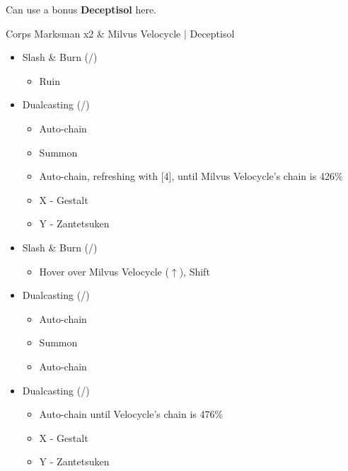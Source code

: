 \begin{multicols}{2}
  Can use a bonus \textbf{Deceptisol} here.
\vfill
\end{multicols}

\renewcommand{\first}{[1] Slash \& Burn (\com/\rav)}
\renewcommand{\second}{[2] War \& Peace (\com/\med)}
\renewcommand{\third}{[3] Supersoldier (\com/\syn)}
\renewcommand{\fourth}{[4] Dualcasting (\rav/\rav)}
\renewcommand{\fifth}{[5] Dualcasting (\rav/\rav)}
\renewcommand{\sixth}{[6] Slash \& Burn (\com/\rav)}
\begin{battle}{Corps Marksman x2 \& Milvus Velocycle $|$ Deceptisol}
\begin{multicols}{2}
\begin{itemize}
    \item \first
    \begin{itemize}
        \item Ruin
    \end{itemize}
    \item \fifth
    \begin{itemize}
        \item Auto-chain
        \item Summon
        \item Auto-chain, refreshing with [4], until Milvus Velocycle's chain is 426\%
        \item X - Gestalt
        \item Y - Zantetsuken
    \end{itemize}
    \columnbreak
    \item \first
    \begin{itemize}
    		\item Hover over Milvus Velocycle ($\uparrow$), Shift
    	\end{itemize}
    	\item \fifth
    	\begin{itemize}
    		\item Auto-chain
    		\item Summon
    		\item Auto-chain
    	\end{itemize}
    	\item \fourth
    	\begin{itemize}
    		\item Auto-chain until Velocycle's chain is 476\%
    		\item X - Gestalt
    		\item Y - Zantetsuken
    	\end{itemize}
\end{itemize}
\end{multicols}
\end{battle}
